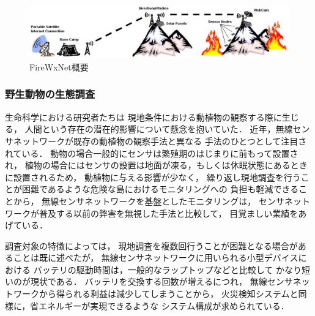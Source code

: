\begin{figure}[htbp]
 \begin{center}
  \includegraphics[width=140mm]{./images/firewxnet_overview.eps}
 \end{center}
 \caption{FireWxNet概要}
 \label{fig:firewxnet_overview}
\end{figure}




\subsubsection{野生動物の生態調査}

\vspace{0.5em}生命科学における研究者たちは
現地条件における動植物の観察する際に生じる，
人間という存在の潜在的影響について懸念を抱いていた．
近年，無線センサネットワークが既存の動植物の観察手法と異なる
手法のひとつとして注目されている．
動物の場合一般的にセンサは繁殖期のはじまりに前もって設置され，
植物の場合にはセンサの設置は地面が凍る，もしくは休眠状態にあるときに設置されるため，
動植物に与える影響が少なく，
繰り返し現地調査を行うことが困難であるような危険な島におけるモニタリングへの
負担も軽減できることから，
無線センサネットワークを基盤としたモニタリングは，
センサネットワークが普及する以前の弊害を無視した手法と比較して，
目覚ましい業績をあげている．

調査対象の特徴によっては，
現地調査を複数回行うことが困難となる場合があることは既に述べたが，
無線センサネットワークに用いられる小型デバイスにおける
バッテリの駆動時間は，一般的なラップトップなどと比較して
かなり短いのが現状である．
バッテリを交換する回数が増えるにつれ，
無線センサネットワークから得られる利益は減少してしまうことから，
火災検知システムと同様に，省エネルギーが実現できるような
システム構成が求められている．


